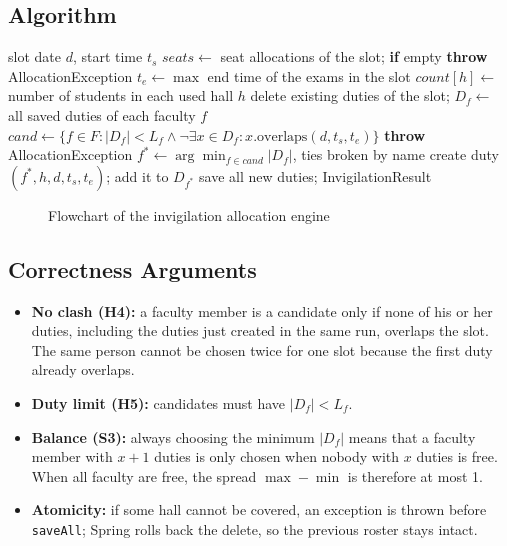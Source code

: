 \documentclass[11pt,a4paper]{article}
\begin{document}
\subsection{Algorithm}
\begin{algorithm}[H]
\caption{Least-loaded-first invigilator assignment}
\begin{algorithmic}[1]
\Require slot date $d$, start time $t_s$
\State $seats \gets$ seat allocations of the slot; \textbf{if} empty \textbf{throw} AllocationException
\State $t_e \gets \max$ end time of the exams in the slot
\State $count[h] \gets$ number of students in each used hall $h$
\State delete existing duties of the slot; $D_f \gets$ all saved duties of each faculty $f$
    \State $cand \gets \{ f \in F : |D_f| < L_f \wedge \neg\exists x \in D_f : x.\mathrm{overlaps}(d, t_s, t_e) \}$
     \State \textbf{throw} AllocationException  \EndIf
    \State $f^* \gets \arg\min_{f \in cand} |D_f|$, ties broken by name
    \State create duty $(f^*, h, d, t_s, t_e)$; add it to $D_{f^*}$
  \EndFor
\EndFor
\State save all new duties; \Return InvigilationResult
\end{algorithmic}
\end{algorithm}

\begin{figure}[H]\centering
\resizebox{!}{0.55\textheight}{}
\caption{Flowchart of the invigilation allocation engine}
\end{figure}

\subsection{Correctness Arguments}
\begin{itemize}
  \item \textbf{No clash (H4):} a faculty member is a candidate only if none of his or her duties, including the duties just created in the same run, overlaps the slot. The same person cannot be chosen twice for one slot because the first duty already overlaps.
  \item \textbf{Duty limit (H5):} candidates must have $|D_f| < L_f$.
  \item \textbf{Balance (S3):} always choosing the minimum $|D_f|$ means that a faculty member with $x+1$ duties is only chosen when nobody with $x$ duties is free. When all faculty are free, the spread $\max - \min$ is therefore at most 1.
  \item \textbf{Atomicity:} if some hall cannot be covered, an exception is thrown before \texttt{saveAll}; Spring rolls back the delete, so the previous roster stays intact.
\end{itemize}
\end{document}

